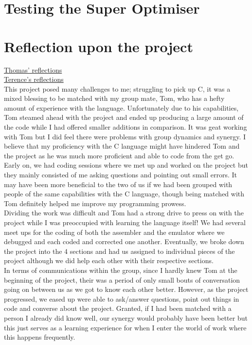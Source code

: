 \documentclass[11pt]{article}
\begin{document}
\section{Testing the Super Optimiser}
 

\section{Reflection upon the project}
\underline{Thomas' reflections}
\\

\noindent\underline{Terence's reflections}
\\ 
\indent This project posed many challenges to me; struggling to pick up C, it was a mixed blessing to be matched with my group mate, Tom, who has a hefty amount of experience with the language. Unfortunately due to his capabilities, Tom steamed ahead with the project and ended up producing  a large amount of the code while I had offered smaller additions in comparison. 
It was geat working with Tom but I did feel there were problems with group dynamics and synergy. I believe that my proficiency with the C language might have hindered Tom and the project as he was much more proficient and able to code from the get go. Early on, we had coding sessions where we met up and worked on the project but they mainly consisted of me asking questions and pointing out small errors. It may have been more beneficial to the two of us if we had been grouped with people of the same capabilities with the C language, though being matched with Tom definitely helped me improve my programming prowess. 
\\
\indent Dividing the work was difficult and Tom had a strong drive to press on with the project while I was preoccupied with learning the language itself! We had several meet ups for the coding of both the assembler and the emulator where we debugged and each coded and corrected one another. Eventually, we broke down the project into the 4 sections and had us assigned to individual pieces of the project although we did help each other with their respective sections.
\\
\indent In terms of communications within the group, since I hardly knew Tom at the beginning of the project, their was a period of only small bouts of conversation going on between us as we got to know each other better. However, as the project progressed, we eased up were able to ask/answer questions, point out things in code and converse about the project. Granted, if I had been matched with a person I already did know well, our synergy would probably have been better but this just serves as a learning experience for when I enter the world of work where this happens frequently.
\end{document}

